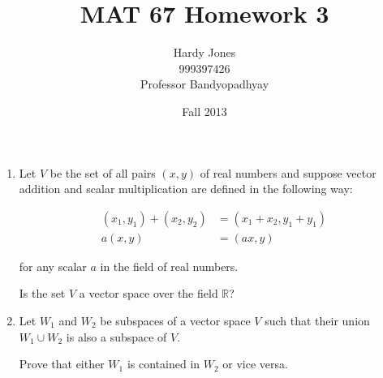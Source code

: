 \documentclass[12pt,letterpaper]{article}
\title{MAT 67 Homework 3\vspace{-2ex}}
\author{Hardy Jones\\
        999397426\\
        Professor Bandyopadhyay\vspace{-2ex}}
\date{Fall 2013}
\begin{document}
  \maketitle

  \begin{enumerate}
    \item
      Let $V$ be the set of all pairs $(x,y)$ of real numbers and suppose vector addition and scalar multiplication are defined in the following way:

      \begin{align*}
        (x_1,y_1) + (x_2,y_2) &= (x_1 + x_2, y_1 + y_1) \\
        a(x,y) &= (ax,y)
      \end{align*}

      for any scalar $a$ in the field of real numbers.

      Is the set $V$ a vector space over the field $\mathbb{R}$?

    \item
      Let $W_1$ and $W_2$ be subspaces of a vector space $V$ such that their union $W_1 \cup W_2$ is also a subspace of $V$.

      Prove that either $W_1$ is contained in $W_2$ or vice versa.
  \end{enumerate}
\end{document}
